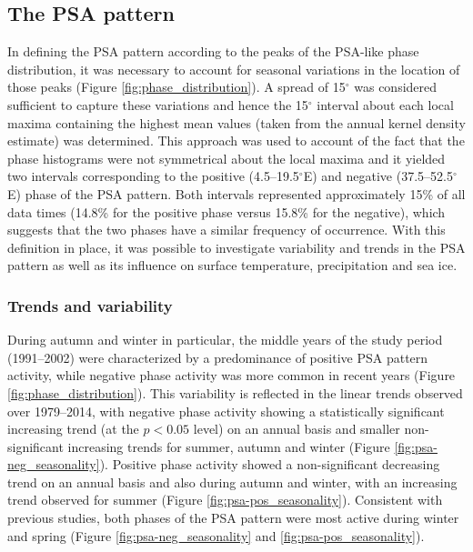 \subsection{The PSA pattern}\label{s:psa_results}

In defining the PSA pattern according to the peaks of the PSA-like phase distribution, it was necessary to account for seasonal variations in the location of those peaks (Figure \ref{fig:phase_distribution}). A spread of 15$^{\circ}$ was considered sufficient to capture these variations and hence the 15$^{\circ}$ interval about each local maxima containing the highest mean values (taken from the annual kernel density estimate) was determined. This approach was used to account of the fact that the phase histograms were not symmetrical about the local maxima and it yielded two intervals corresponding to the positive (4.5--19.5$^{\circ}$E) and negative (37.5--52.5$^{\circ}$E) phase of the PSA pattern. Both intervals represented approximately 15\% of all data times (14.8\% for the positive phase versus 15.8\% for the negative), which suggests that the two phases have a similar frequency of occurrence. With this definition in place, it was possible to investigate variability and trends in the PSA pattern as well as its influence on surface temperature, precipitation and sea ice. 

\subsubsection{Trends and variability}

During autumn and winter in particular, the middle years of the study period (1991--2002) were characterized by a predominance of positive PSA pattern activity, while negative phase activity was more common in recent years (Figure \ref{fig:phase_distribution}). This variability is reflected in the linear trends observed over 1979--2014, with negative phase activity showing a statistically significant increasing trend (at the $p < 0.05$ level) on an annual basis and smaller non-significant increasing trends for summer, autumn and winter (Figure \ref{fig:psa-neg_seasonality}). Positive phase activity showed a non-significant decreasing trend on an annual basis and also during autumn and winter, with an increasing trend observed for summer (Figure \ref{fig:psa-pos_seasonality}). Consistent with previous studies, both phases of the PSA pattern were most active during winter and spring (Figure \ref{fig:psa-neg_seasonality} and \ref{fig:psa-pos_seasonality}). 

